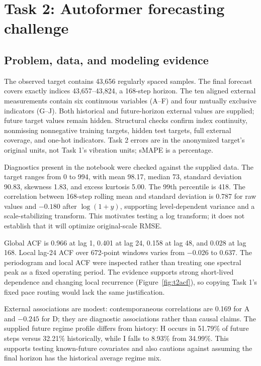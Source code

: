 \clearpage
\section*{Task 2: Autoformer forecasting challenge}
\subsection*{Problem, data, and modeling evidence}
The observed target contains 43,656 regularly spaced samples. The final forecast covers exactly indices 43,657--43,824, a 168-step horizon. The ten aligned external measurements contain six continuous variables (A--F) and four mutually exclusive indicators (G--J). Both historical and future-horizon external values are supplied; future target values remain hidden. Structural checks confirm index continuity, nonmissing nonnegative training targets, hidden test targets, full external coverage, and one-hot indicators. Task 2 errors are in the anonymized target's original units, not Task 1's vibration units; sMAPE is a percentage.

Diagnostics present in the notebook were checked against the supplied data. The target ranges from 0 to 994, with mean 98.17, median 73, standard deviation 90.83, skewness 1.83, and excess kurtosis 5.00. The 99th percentile is 418. The correlation between 168-step rolling mean and standard deviation is 0.787 for raw values and $-0.180$ after $\log(1+y)$, supporting level-dependent variance and a scale-stabilizing transform. This motivates testing a log transform; it does not establish that it will optimize original-scale RMSE.

Global ACF is 0.966 at lag 1, 0.401 at lag 24, 0.158 at lag 48, and 0.028 at lag 168. Local lag-24 ACF over 672-point windows varies from $-0.026$ to 0.637. The periodogram and local ACF were inspected rather than treating one spectral peak as a fixed operating period. The evidence supports strong short-lived dependence and changing local recurrence (Figure~\ref{fig:t2acf}), so copying Task 1's fixed pace routing would lack the same justification.

External associations are modest: contemporaneous correlations are 0.169 for A and $-0.245$ for D; they are diagnostic associations rather than causal claims. The supplied future regime profile differs from history: H occurs in 51.79\% of future steps versus 32.21\% historically, while I falls to 8.93\% from 34.99\%. This supports testing known-future covariates and also cautions against assuming the final horizon has the historical average regime mix.

